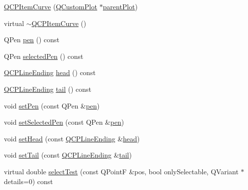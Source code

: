 \begin{DoxyCompactItemize}
\item 
\hyperlink{class_q_c_p_item_curve_ac9b7508bb5c8827e1a7a6199f8c82bec}{Q\-C\-P\-Item\-Curve} (\hyperlink{class_q_custom_plot}{Q\-Custom\-Plot} $\ast$\hyperlink{class_q_c_p_layerable_ab7e0e94461566093d36ffc0f5312b109}{parent\-Plot})
\item 
virtual \hyperlink{class_q_c_p_item_curve_ae36f20fd5deff2f1443a7c53eaa95c81}{$\sim$\-Q\-C\-P\-Item\-Curve} ()
\item 
Q\-Pen \hyperlink{class_q_c_p_item_curve_abc6321e55a9ba1a0c7df407843dfa252}{pen} () const 
\item 
Q\-Pen \hyperlink{class_q_c_p_item_curve_abd8b8be5b13bc4dafec4c1758c281336}{selected\-Pen} () const 
\item 
\hyperlink{class_q_c_p_line_ending}{Q\-C\-P\-Line\-Ending} \hyperlink{class_q_c_p_item_curve_afc067f0d1e60cd04812f2c2c7fdf36c3}{head} () const 
\item 
\hyperlink{class_q_c_p_line_ending}{Q\-C\-P\-Line\-Ending} \hyperlink{class_q_c_p_item_curve_a9adddfcc5275be0cf27e3c0c31c37c1a}{tail} () const 
\item 
void \hyperlink{class_q_c_p_item_curve_a034be908440aec785c34b92843461221}{set\-Pen} (const Q\-Pen \&\hyperlink{class_q_c_p_item_curve_abc6321e55a9ba1a0c7df407843dfa252}{pen})
\item 
void \hyperlink{class_q_c_p_item_curve_a375b917669f868c5a106bf2f1ab7c26d}{set\-Selected\-Pen} (const Q\-Pen \&\hyperlink{class_q_c_p_item_curve_abc6321e55a9ba1a0c7df407843dfa252}{pen})
\item 
void \hyperlink{class_q_c_p_item_curve_a08a30d9cdd63995deea3d9e20430676f}{set\-Head} (const \hyperlink{class_q_c_p_line_ending}{Q\-C\-P\-Line\-Ending} \&\hyperlink{class_q_c_p_item_curve_afc067f0d1e60cd04812f2c2c7fdf36c3}{head})
\item 
void \hyperlink{class_q_c_p_item_curve_ac3488d8b1a6489c845dc5bff3ef71124}{set\-Tail} (const \hyperlink{class_q_c_p_line_ending}{Q\-C\-P\-Line\-Ending} \&\hyperlink{class_q_c_p_item_curve_a9adddfcc5275be0cf27e3c0c31c37c1a}{tail})
\item 
virtual double \hyperlink{class_q_c_p_item_curve_a741375c11667b5f9c95b2683f93ee514}{select\-Test} (const Q\-Point\-F \&pos, bool only\-Selectable, Q\-Variant $\ast$details=0) const 
\end{DoxyCompactItemize}
